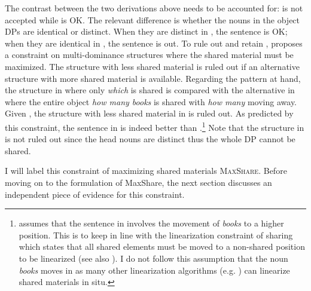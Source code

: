 \documentclass[output=paper]{langscibook}
\begin{document}
\largerpage[2]
The contrast between the two derivations above needs to be accounted for:  is not accepted while  is OK. The relevant difference is whether the nouns in the object DPs are identical or distinct. When they are distinct in , the sentence is OK; when they are identical in , the sentence is out. To rule out  and retain , \cite{Citko:2006} proposes a constraint on multi-dominance structures where the shared material must be maximized. The structure with less shared material is ruled out if an alternative structure with more shared material is available. Regarding the pattern at hand, the structure in  where only \textit{which} is shared is compared with the alternative in  where the entire object \textit{how many books} is shared with \textit{how many} moving away. Given , the structure with less shared material in  is ruled out. As predicted by this constraint, the sentence in  is indeed better than .\footnote{\cite{Citko:2006} assumes that the sentence in  involves the movement of \textit{books} to a higher position. This is to keep in line with the linearization constraint of sharing which states that all shared elements must be moved to a non-shared position to be linearized (see also \citealt{Gracanin-Yuksek:2007}). I do not follow this assumption that the noun \textit{books} moves in  as many other linearization algorithms (e.g. \citealt{Wilder:2008, deVries:2009, Gracanin-Yuksek:2013}) can linearize shared materials in situ.} Note that the structure in  is not ruled out since the head nouns are distinct thus the whole DP cannot be shared. 

\z 
I will label this constraint of maximizing shared materials \textsc{MaxShare}. Before moving on to the formulation of MaxShare, the next section discusses an independent piece of evidence for this constraint.
\end{document}
